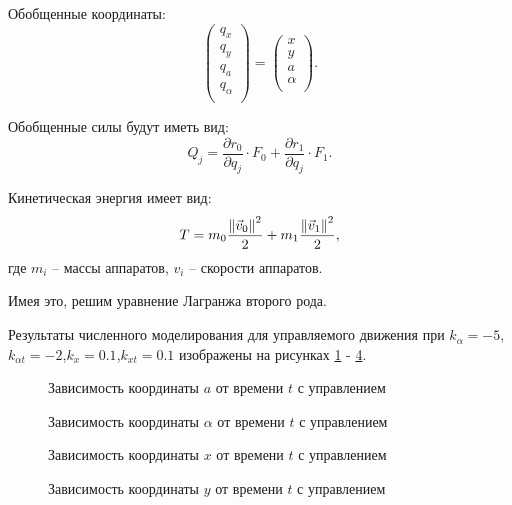 Обобщенные координаты:
\begin{equation}
\label{eq:2sph_qj}
	\begin{pmatrix}
		q_x \\
		q_y \\
		q_a \\
		q_\alpha \\
	\end{pmatrix} 
	=
	\begin{pmatrix}
		x \\
		y \\
		a \\
		\alpha \\
	\end{pmatrix}.
\end{equation}

Обобщенные силы будут иметь вид:
\begin{equation}
\label{eq:2sph_Q}
	Q_j = \frac{\partial r_0}{\partial q_j} \cdot F_0 + \frac{\partial r_1}{\partial q_j} \cdot F_1.
\end{equation}

Кинетическая энергия имеет вид:
\begin{equation}
\label{eq:2sph_T}
	T = m_0 \frac{\left\lVert\vec{v}_0\right\rVert^2}{2} + m_1 \frac{\left\lVert\vec{v}_1\right\rVert^2}{2},
\end{equation}
где $m_i$ – массы аппаратов, $v_i$ – скорости аппаратов.

Имея это, решим уравнение Лагранжа второго рода.

Результаты численного моделирования для управляемого движения при $k_\alpha = -5$,$k_{\alpha t} = -2$,$k_x = 0.1$,$k_{x t} = 0.1$ изображены на рисунках \ref{ris:2sph_a_full_u} - \ref{ris:2sph_y_full_u}.

\begin{figure}[H]
	\caption{Зависимость координаты $a$ от времени $t$ с управлением}
	\label{ris:2sph_a_full_u}
\end{figure}
\begin{figure}[H]
	\caption{Зависимость координаты $\alpha$ от времени $t$ с управлением}
	\label{ris:2sph_alpha_full_u}
\end{figure} 
\begin{figure}[H]
	\caption{Зависимость координаты $x$ от времени $t$ с управлением}
	\label{ris:2sph_x_full_u}
\end{figure} 
\begin{figure}[H]
	\caption{Зависимость координаты $y$ от времени $t$ с управлением}
	\label{ris:2sph_y_full_u}
\end{figure} 

